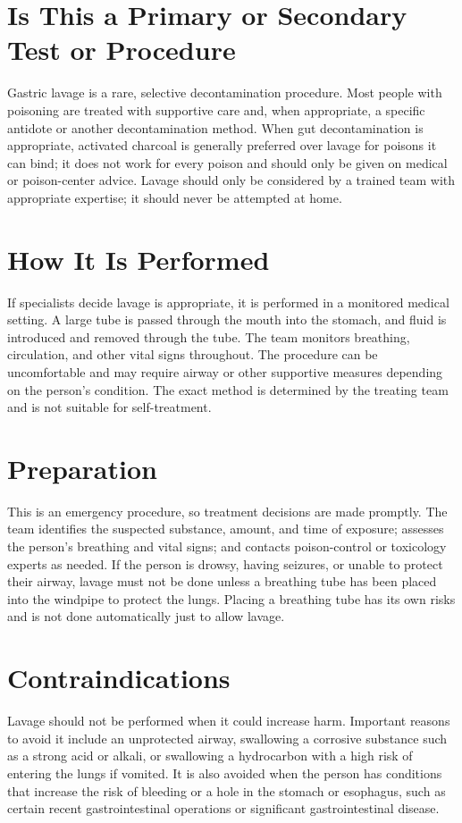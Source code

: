 \section*{Is This a Primary or Secondary Test or Procedure}
Gastric lavage is a rare, selective decontamination procedure. Most people with poisoning are treated with supportive care and, when appropriate, a specific antidote or another decontamination method. When gut decontamination is appropriate, activated charcoal is generally preferred over lavage for poisons it can bind; it does not work for every poison and should only be given on medical or poison-center advice. Lavage should only be considered by a trained team with appropriate expertise; it should never be attempted at home.

\section*{How It Is Performed}
If specialists decide lavage is appropriate, it is performed in a monitored medical setting. A large tube is passed through the mouth into the stomach, and fluid is introduced and removed through the tube. The team monitors breathing, circulation, and other vital signs throughout. The procedure can be uncomfortable and may require airway or other supportive measures depending on the person's condition. The exact method is determined by the treating team and is not suitable for self-treatment.

\section*{Preparation}
This is an emergency procedure, so treatment decisions are made promptly. The team identifies the suspected substance, amount, and time of exposure; assesses the person's breathing and vital signs; and contacts poison-control or toxicology experts as needed. If the person is drowsy, having seizures, or unable to protect their airway, lavage must not be done unless a breathing tube has been placed into the windpipe to protect the lungs. Placing a breathing tube has its own risks and is not done automatically just to allow lavage.

\section*{Contraindications}
Lavage should not be performed when it could increase harm. Important reasons to avoid it include an unprotected airway, swallowing a corrosive substance such as a strong acid or alkali, or swallowing a hydrocarbon with a high risk of entering the lungs if vomited. It is also avoided when the person has conditions that increase the risk of bleeding or a hole in the stomach or esophagus, such as certain recent gastrointestinal operations or significant gastrointestinal disease.

